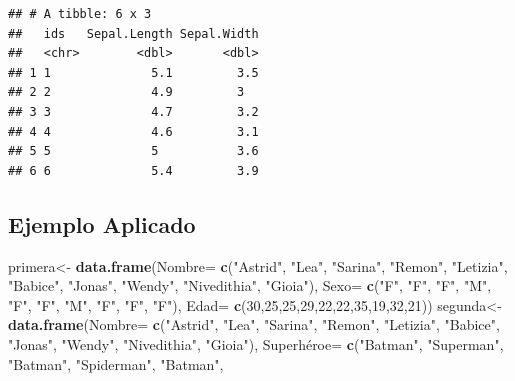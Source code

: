 \documentclass[
]{book}
\newenvironment{Shaded}{\begin{snugshade}}{\end{snugshade}}
\newcommand{\AttributeTok}[1]{\textcolor[rgb]{0.13,0.29,0.53}{#1}}
\newcommand{\DecValTok}[1]{\textcolor[rgb]{0.00,0.00,0.81}{#1}}
\newcommand{\FunctionTok}[1]{\textcolor[rgb]{0.13,0.29,0.53}{\textbf{#1}}}
\newcommand{\NormalTok}[1]{#1}
\newcommand{\OtherTok}[1]{\textcolor[rgb]{0.56,0.35,0.01}{#1}}
\newcommand{\StringTok}[1]{\textcolor[rgb]{0.31,0.60,0.02}{#1}}
\begin{document}
\begin{verbatim}
## # A tibble: 6 x 3
##   ids   Sepal.Length Sepal.Width
##   <chr>        <dbl>       <dbl>
## 1 1              5.1         3.5
## 2 2              4.9         3  
## 3 3              4.7         3.2
## 4 4              4.6         3.1
## 5 5              5           3.6
## 6 6              5.4         3.9
\end{verbatim}

\subsection{Ejemplo Aplicado}\label{ejemplo-aplicado}

\begin{Shaded}
\begin{Highlighting}[]
\NormalTok{primera}\OtherTok{\textless{}{-}} \FunctionTok{data.frame}\NormalTok{(}\AttributeTok{Nombre=} \FunctionTok{c}\NormalTok{(}\StringTok{"Astrid"}\NormalTok{, }\StringTok{"Lea"}\NormalTok{, }\StringTok{"Sarina"}\NormalTok{, }\StringTok{"Remon"}\NormalTok{, }\StringTok{"Letizia"}\NormalTok{, }
                               \StringTok{"Babice"}\NormalTok{, }\StringTok{"Jonas"}\NormalTok{, }\StringTok{"Wendy"}\NormalTok{, }\StringTok{"Nivedithia"}\NormalTok{, }\StringTok{"Gioia"}\NormalTok{),}
                     \AttributeTok{Sexo=} \FunctionTok{c}\NormalTok{(}\StringTok{"F"}\NormalTok{, }\StringTok{"F"}\NormalTok{, }\StringTok{"F"}\NormalTok{, }\StringTok{"M"}\NormalTok{, }\StringTok{"F"}\NormalTok{, }\StringTok{"F"}\NormalTok{, }\StringTok{"M"}\NormalTok{, }\StringTok{"F"}\NormalTok{, }\StringTok{"F"}\NormalTok{, }\StringTok{"F"}\NormalTok{),}
                     \AttributeTok{Edad=} \FunctionTok{c}\NormalTok{(}\DecValTok{30}\NormalTok{,}\DecValTok{25}\NormalTok{,}\DecValTok{25}\NormalTok{,}\DecValTok{29}\NormalTok{,}\DecValTok{22}\NormalTok{,}\DecValTok{22}\NormalTok{,}\DecValTok{35}\NormalTok{,}\DecValTok{19}\NormalTok{,}\DecValTok{32}\NormalTok{,}\DecValTok{21}\NormalTok{))}
\NormalTok{segunda}\OtherTok{\textless{}{-}} \FunctionTok{data.frame}\NormalTok{(}\AttributeTok{Nombre=} \FunctionTok{c}\NormalTok{(}\StringTok{"Astrid"}\NormalTok{, }\StringTok{"Lea"}\NormalTok{, }\StringTok{"Sarina"}\NormalTok{, }\StringTok{"Remon"}\NormalTok{, }\StringTok{"Letizia"}\NormalTok{, }
                               \StringTok{"Babice"}\NormalTok{, }\StringTok{"Jonas"}\NormalTok{, }\StringTok{"Wendy"}\NormalTok{, }\StringTok{"Nivedithia"}\NormalTok{, }\StringTok{"Gioia"}\NormalTok{),}
\NormalTok{                     Superhéroe}\OtherTok{=} \FunctionTok{c}\NormalTok{(}\StringTok{"Batman"}\NormalTok{, }\StringTok{"Superman"}\NormalTok{, }\StringTok{"Batman"}\NormalTok{, }\StringTok{"Spiderman"}\NormalTok{, }\StringTok{"Batman"}\NormalTok{, }

\end{Highlighting}
\end{Shaded}
\end{document}
